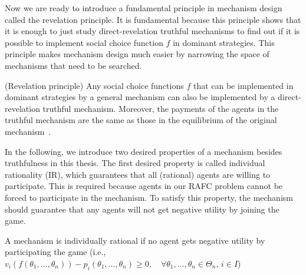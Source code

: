 \documentclass[11pt]{phdthesis}
\begin{document}
%
Now we are ready to introduce a fundamental principle in mechanism design called the revelation principle. It is fundamental because this principle shows that it is enough to just study direct-revelation truthful mechanisms to find out if it is possible to implement social choice function $f$ in dominant strategies. This principle makes mechanism design much easier by narrowing the space of mechanisms that need to be searched. 

\begin{proposition}(Revelation principle) \label{revelation principle}
	Any social choice functions $f$ that can be implemented in dominant strategies by a general mechanism can also be implemented by a direct-revelation truthful mechanism. Moreover, the payments of the agents in the truthful mechanism are the same as those in the equilibrium of the original mechanism~\citep[Proposition 9.25]{nisan2007algorithmic}.
\end{proposition}



In the following, we introduce two desired properties of a mechanism besides truthfulness in this thesis. The first desired property is called individual rationality (IR), which guarantees that all (rational) agents are willing to participate. This is required because agents in our RAFC problem cannot be forced to participate in the mechanism. To satisfy this property, the mechanism should guarantee that any agents will not get negative utility by joining the game. 
\begin{definition} [IR]
	A mechanism is individually rational if no agent gets negative utility by participating the game (i.e., $v_i(f(\theta_1,...,\theta_n)) - p_i(\theta_1,...,\theta_n) \geq 0, \quad \forall \theta_1 ,\ldots,\theta_n \in \Theta_n, \, i \in I$)~\citep[Definition 9.18]{nisan2007algorithmic}
\end{definition}

\end{document}
